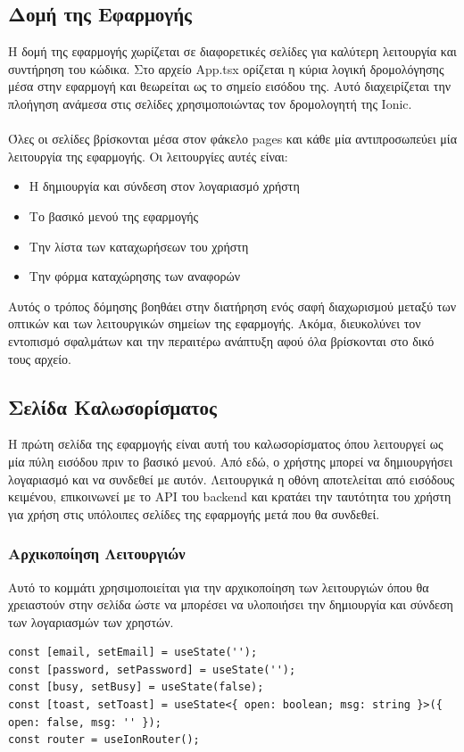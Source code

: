 \subsection{Δομή της Εφαρμογής}
Η δομή της εφαρμογής χωρίζεται σε διαφορετικές σελίδες για καλύτερη λειτουργία και συντήρηση του κώδικα. Στο αρχείο App.tsx ορίζεται η κύρια λογική δρομολόγησης μέσα στην εφαρμογή και θεωρείται ως το σημείο εισόδου της. Αυτό διαχειρίζεται την πλοήγηση ανάμεσα στις σελίδες χρησιμοποιώντας τον δρομολογητή της Ionic.
\\
\\
Όλες οι σελίδες βρίσκονται μέσα στον φάκελο pages και κάθε μία αντιπροσωπεύει μία λειτουργία της εφαρμογής. Οι λειτουργίες αυτές είναι:
\begin{itemize}
  \item Η δημιουργία και σύνδεση στον λογαριασμό χρήστη
  \item Το βασικό μενού της εφαρμογής
  \item Την λίστα των καταχωρήσεων του χρήστη
  \item Την φόρμα καταχώρησης των αναφορών
\end{itemize}

Αυτός ο τρόπος δόμησης βοηθάει στην διατήρηση ενός σαφή διαχωρισμού μεταξύ των οπτικών και των λειτουργικών σημείων της εφαρμογής. Ακόμα, διευκολύνει τον εντοπισμό σφαλμάτων και την περαιτέρω ανάπτυξη αφού όλα βρίσκονται στο δικό τους αρχείο.

\subsection{Σελίδα Καλωσορίσματος}
Η πρώτη σελίδα της εφαρμογής είναι αυτή του καλωσορίσματος όπου λειτουργεί ως μία πύλη εισόδου πριν το βασικό μενού. Από εδώ, ο χρήστης μπορεί να δημιουργήσει λογαριασμό και να συνδεθεί με αυτόν. Λειτουργικά η οθόνη αποτελείται από εισόδους κειμένου, επικοινωνεί με το API του backend και κρατάει την ταυτότητα του χρήστη για χρήση στις υπόλοιπες σελίδες της εφαρμογής μετά που θα συνδεθεί. 

\subsubsection*{Αρχικοποίηση Λειτουργιών}
Αυτό το κομμάτι χρησιμοποιείται για την αρχικοποίηση των λειτουργιών όπου θα χρειαστούν στην σελίδα ώστε να μπορέσει να υλοποιήσει την δημιουργία και σύνδεση των λογαριασμών των χρηστών.
\\
\begin{lstlisting}
const [email, setEmail] = useState('');   
const [password, setPassword] = useState('');
const [busy, setBusy] = useState(false);
const [toast, setToast] = useState<{ open: boolean; msg: string }>({ open: false, msg: '' });
const router = useIonRouter();
\end{lstlisting}

